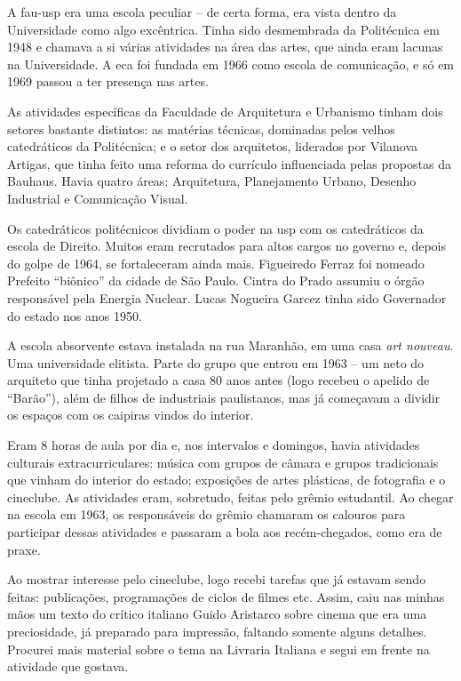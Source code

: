 {A {\sc fau-usp} era uma escola peculiar -- de certa forma, era vista dentro da
Universidade como algo excêntrica. Tinha sido desmembrada da Politécnica
em 1948 e chamava a si várias atividades na área das artes, que ainda
eram lacunas na Universidade. A {\sc eca} foi fundada em 1966 como escola de
comunicação, e só em 1969 passou a ter presença nas artes.

As atividades específicas da Faculdade de Arquitetura e
Urbanismo tinham dois setores bastante distintos: as matérias técnicas,
dominadas pelos velhos catedráticos da Politécnica; e o setor dos arquitetos,
liderados por Vilanova Artigas, que tinha feito uma reforma do currículo
influenciada pelas propostas da Bauhaus. Havia quatro áreas: Arquitetura,
Planejamento Urbano, Desenho Industrial e Comunicação Visual.

Os catedráticos politécnicos dividiam o poder na {\sc usp} com os catedráticos
da escola de Direito. Muitos eram recrutados para altos cargos no
governo e, depois do golpe de 1964, se fortaleceram ainda mais. Figueiredo
Ferraz foi nomeado Prefeito “biônico” da cidade de São Paulo. Cintra do
Prado assumiu o órgão responsável pela Energia Nuclear. Lucas
Nogueira Garcez tinha sido Governador do estado nos anos 1950.

A escola absorvente estava instalada na rua Maranhão, em uma casa {\it art
nouveau}. Uma universidade elitista. Parte do grupo que entrou em 1963 -- um
neto do arquiteto que tinha projetado a casa 80 anos antes (logo recebeu
o apelido de “Barão”), além de filhos de industriais paulistanos, mas já
começavam a dividir os espaços com os caipiras vindos do interior.

Eram 8 horas de aula por dia e, nos intervalos e domingos, havia atividades
culturais extracurriculares: música com grupos de câmara e grupos
tradicionais que vinham do interior do estado; exposições de artes
plásticas, de fotografia e o cineclube. As atividades eram, sobretudo,
feitas pelo grêmio estudantil. Ao chegar na escola em 1963, os
responsáveis do grêmio chamaram os calouros para participar dessas
atividades e passaram a bola aos recém-chegados, como era de praxe.

Ao mostrar interesse pelo cineclube, logo recebi tarefas que já estavam
sendo feitas: publicações, programações de ciclos de filmes etc. Assim,
caiu nas minhas mãos um texto do crítico italiano Guido Aristarco sobre
cinema que era uma preciosidade, já preparado para impressão, faltando
somente alguns detalhes. Procurei mais material sobre o tema na Livraria
Italiana e segui em frente na atividade que gostava.

}
